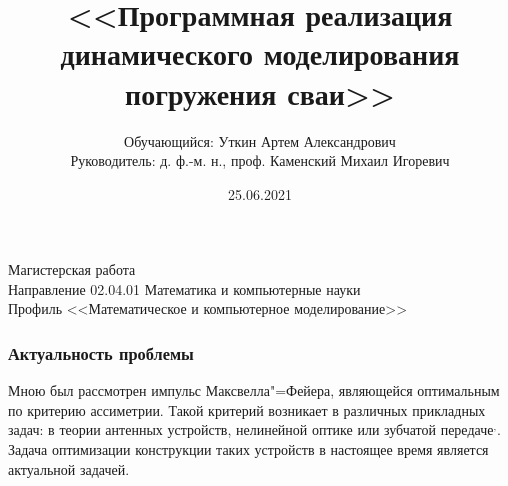 \documentclass[10pt, pdf, hyperref={unicode}]{beamer}
\title{<<Программная реализация динамического моделирования погружения сваи>>}
\date{25.06.2021}
\author{Обучающийся: Уткин Артем Александрович\\
    \vspace{0.7cm}
    Руководитель: д. ф.-м. н., проф. Каменский Михаил Игоревич\\
    \vspace{0.7cm}
}
\begin{document}
    \begin{frame} %
        \titlepage
        \begin{center}
            Магистерская работа\\
            Направление 02.04.01 Математика и компьютерные науки\\
            Профиль <<Математическое и компьютерное моделирование>>\\
        \end{center}
    \end{frame}


    \begin{frame}
        \frametitle{Актуальность проблемы}
        \begin{center}
            \begin{center}
                \begin{minipage}[h]{0.97\linewidth}
                    Мною был рассмотрен импульс Максвелла"=Фейера, являющейся оптимальным по критерию ассиметрии.
                    \newline\newline
                    Такой критерий возникает в различных прикладных задач: в теории антенных устройств, нелинейной оптике или зубчатой передаче\footnotemark[1]${}^,$\footnotemark[2].
                    Задача оптимизации конструкции таких устройств в настоящее время является актуальной задачей.
                \end{minipage}
            \end{center}
        \end{center}
    \end{frame}
\end{document}
